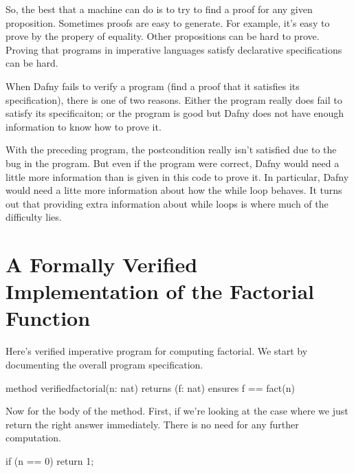 \documentclass[letterpaper,10pt,english]{sphinxmanual}
\begin{document}
So, the best that a machine can do is to try to find a proof for any
given proposition. Sometimes proofs are easy to generate. For example,
it’s easy to prove  by the  propery of equality.
Other propositions can be hard to prove. Proving that programs in
imperative languages satisfy declarative specifications can be hard.

When Dafny fails to verify a program (find a proof that it satisfies
its specification), there is one of two reasons. Either the program
really does fail to satisfy its specificaiton; or the program is good
but Dafny does not have enough information to know how to prove it.

With the preceding program, the postcondition really isn’t satisfied
due to the bug in the program. But even if the program were correct,
Dafny would need a little more information than is given in this code
to prove it. In particular, Dafny would need a litte more information
about how the while loop behaves. It turns out that providing extra
information about while loops is where much of the difficulty lies.


\section{A Formally Verified Implementation of the Factorial Function}
\label{\detokenize{05-putting-it-together:a-formally-verified-implementation-of-the-factorial-function}}
\begin{sphinxVerbatim}[commandchars=\\\{\}]

\end{sphinxVerbatim}

Here’s verified imperative program for computing factorial. We start
by documenting the overall program specification.

\begin{sphinxVerbatim}[commandchars=\\\{\}]
method verified\PYGZus{}factorial(n: nat) returns (f: nat)
    ensures f == fact(n)
\end{sphinxVerbatim}

Now for the body of the method. First, if we’re looking at the case
where  we just return the right answer immediately. There is
no need for any further computation.

\begin{sphinxVerbatim}[commandchars=\\\{\}]
if (n == 0)
\PYGZob{}
    return 1;
\PYGZcb{}
\end{sphinxVerbatim}
\end{document}
